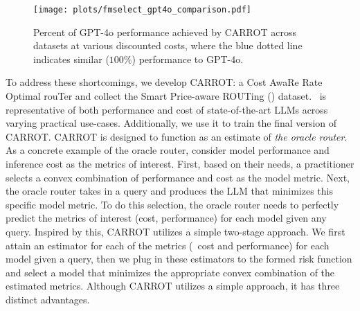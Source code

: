 \begin{wrapfigure}[23]{r}{0.45\textwidth}
\vspace{-0.4cm}
  \begin{center}
     \texttt{[image: plots/fmselect\_gpt4o\_comparison.pdf]} 
  \end{center}
  \caption{Percent of GPT-4o performance achieved by CARROT across datasets at various discounted costs, where the blue dotted line indicates similar ($100\%$) performance to GPT-4o.
  }
\label{fig:IBMMix-spider}
\end{wrapfigure}



To address these shortcomings, we develop CARROT: a Cost AwaRe Rate Optimal rouTer and collect the Smart Price-aware ROUTing (\newdata) dataset. \newdata\ is representative of both performance and cost of state-of-the-art LLMs across varying practical use-cases. Additionally, we use it to train the final version of CARROT. CARROT is designed to function as an estimate of \emph{the oracle router}. As a concrete example of the oracle router, consider model performance and inference cost as the metrics of interest. First, based on their needs, a practitioner selects a convex combination of performance and cost as the model metric. Next, the oracle router takes in a query and produces the LLM that minimizes this specific model metric. To do this selection, the oracle router needs to perfectly predict the metrics of interest (cost, performance) for each model given any query. Inspired by this, CARROT %
utilizes a simple two-stage approach. We first attain an estimator for each of the metrics (\eg\ cost and performance) for each model given a query, then we plug in these estimators to the formed risk function and select a model that minimizes the appropriate convex combination of the estimated metrics. Although CARROT utilizes a simple approach, it has three distinct advantages.

